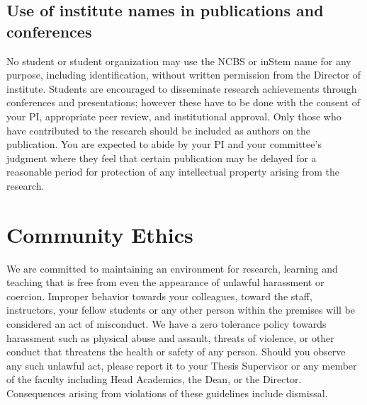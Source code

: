 \documentclass[a4paper,10pt]{article}
\begin{document}
\subsection{Use of institute names in publications and conferences}
No student or student
organization may use the NCBS or inStem name for any purpose, including identification,
without written permission from the Director of institute. Students are encouraged to
disseminate research achievements through conferences and presentations; however these
have to be done with the consent of your PI, appropriate peer review, and institutional
approval. Only those who have contributed to the research should be included as authors on
the publication. You are expected to abide by your PI and your committee’s judgment where
they feel that certain publication may be delayed for a reasonable period for protection of
any intellectual property arising from the research.

\section{Community Ethics}
We are committed to maintaining an environment for research, learning and teaching that is
free from even the appearance of unlawful harassment or coercion. Improper behavior
towards your colleagues, toward the staff, instructors, your fellow students or any other
person within the premises will be considered an act of misconduct. We have a zero
tolerance policy towards harassment such as physical abuse and assault, threats of violence,
or other conduct that threatens the health or safety of any person. Should you observe any
such unlawful act, please report it to your Thesis Supervisor or any member of the faculty
including Head Academics, the Dean, or the Director. Consequences arising from violations
of these guidelines include dismissal.
\end{document}
